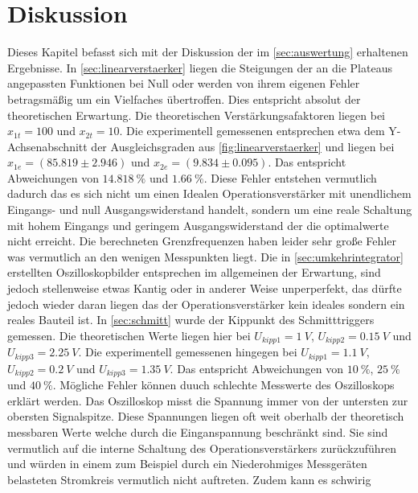 

\section{Diskussion}
\label{sec:Diskussion}

Dieses Kapitel befasst sich mit der Diskussion der im \autoref{sec:auswertung} erhaltenen Ergebnisse.
In \autoref{sec:linearverstaerker} liegen die Steigungen der an die Plateaus angepassten Funktionen
bei Null oder werden von ihrem eigenen Fehler betragsmäßig um ein Vielfaches übertroffen. Dies entspricht
absolut der theoretischen Erwartung. Die theoretischen Verstärkungsafaktoren liegen bei $x_{1t}=100$ und
$x_{2t}=10$. Die experimentell gemessenen entsprechen etwa dem Y-Achsenabschnitt der Ausgleichsgraden aus
\autoref{fig:linearverstaerker} und liegen bei $x_{1e}=(85.819\pm 2.946)$ und $x_{2e}=(9.834 \pm 0.095)$.
Das entspricht Abweichungen von $\SI[]{14.818}[]{\%}$ und $\SI[]{1.66}[]{\%}$. Diese Fehler entstehen vermutlich
dadurch das es sich nicht um einen Idealen Operationsverstärker mit unendlichem Eingangs- und null 
Ausgangswiderstand handelt, sondern um eine reale Schaltung mit hohem Eingangs und geringem Ausgangswiderstand
der die optimalwerte nicht erreicht. Die berechneten Grenzfrequenzen haben leider sehr große Fehler was
vermutlich an den wenigen Messpunkten liegt.
Die in \autoref{sec:umkehrintegrator} erstellten Oszilloskopbilder entsprechen im allgemeinen der Erwartung,
sind jedoch stellenweise etwas Kantig oder in anderer Weise unperperfekt, das dürfte jedoch wieder daran liegen das
der Operationsverstärker kein ideales sondern ein reales Bauteil ist.
In \autoref{sec:schmitt} wurde der Kippunkt des Schmitttriggers gemessen.
Die theoretischen Werte liegen hier bei $U_{kipp1}=\SI[]{1}[]{V}$, $U_{kipp2}=\SI[]{0.15}[]{V}$ und $U_{kipp3}=\SI[]{2.25}[]{V}$.
Die experimentell gemessenen hingegen bei $U_{kipp1}=\SI[]{1.1}[]{V}$, $U_{kipp2}=\SI[]{0.2}[]{V}$ und $U_{kipp3}=\SI[]{1.35}[]{V}$.
Das entspricht Abweichungen von $\SI[]{10}[]{\%}$, $\SI[]{25}[]{\%}$ und $\SI[]{40}[]{\%}$. 
Mögliche Fehler können duuch schlechte Messwerte des Oszilloskops erklärt werden. Das Oszilloskop misst 
die Spannung immer von der untersten zur obersten Signalspitze. Diese Spannungen liegen oft weit oberhalb 
der theoretisch messbaren Werte welche durch die Einganspannung beschränkt sind. Sie sind vermutlich auf 
die interne Schaltung des Operationsverstärkers zurückzuführen und würden in einem zum Beispiel
durch ein Niederohmiges Messgeräten belasteten Stromkreis vermutlich nicht auftreten. Zudem kann es schwirig
